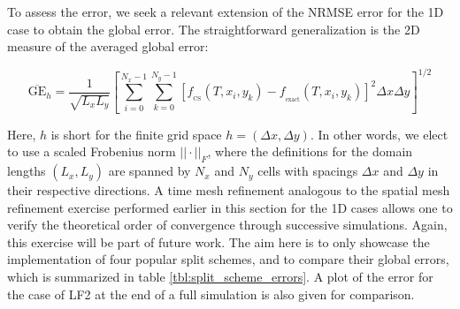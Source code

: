 \documentclass[11pt,titlepage]{report}
\begin{document}
To assess the error, we seek a relevant extension of the NRMSE error for the 1D case to obtain the global error. The straightforward generalization is the 2D measure of the averaged global error:

\begin{equation}\overline{\text{GE}}_{h} = \frac{1}{\sqrt{L_x L_y}}\left[\sum\limits_{i = 0}^{N_x - 1}\sum\limits_{k = 0}^{N_y - 1} [f_{_{\mathrm{CS}}}(T,x_i,y_k) - f_{_{\mathrm{exact}}}(T,x_i,y_k)]^2\Delta x\Delta y\right]^{1/2} \label{eq:GE_2D}\end{equation}

\noindent Here, $h$ is short for the finite grid space $h = (\Delta x, \Delta y)$. In other words, we elect to use a scaled Frobenius norm $||\cdot ||_F$, where the definitions for the domain lengths $(L_x,L_y)$ are spanned by $N_x$ and $N_y$ cells with spacings $\Delta x$ and $\Delta y$ in their respective directions. A time mesh refinement analogous to the spatial mesh refinement exercise performed earlier in this section for the 1D cases allows one to verify the theoretical order of convergence through successive simulations. Again, this exercise will be part of future work. The aim here is to only showcase the implementation of four popular split schemes, and to compare their global errors, which is summarized in table \ref{tbl:split_scheme_errors}. A plot of the error for the case of LF2 at the end of a full simulation is also given for comparison.
\end{document}
